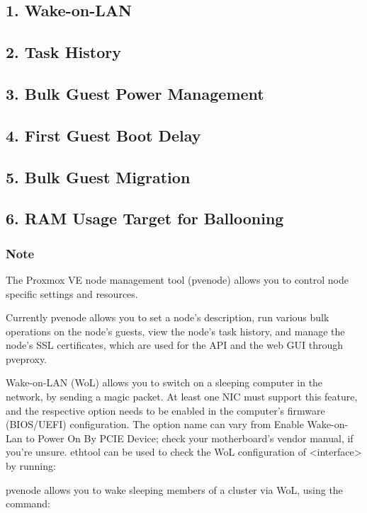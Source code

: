 \subsection{1. Wake-on-LAN}

\subsection{2. Task History}

\subsection{3. Bulk Guest Power Management}

\subsection{4. First Guest Boot Delay}

\subsection{5. Bulk Guest Migration}

\subsection{6. RAM Usage Target for Ballooning}

\subsubsection{Note}

The Proxmox VE node management tool (pvenode) allows you to control node specific settings and resources.

Currently pvenode allows you to set a node’s description, run various bulk operations on the node’s guests, view the node’s task history, and manage the node’s SSL certificates, which are used for the API and the web GUI through pveproxy.

Wake-on-LAN (WoL) allows you to switch on a sleeping computer in the network, by sending a magic packet. At least one NIC must support this feature, and the respective option needs to be enabled in the computer’s firmware (BIOS/UEFI) configuration. The option name can vary from Enable Wake-on-Lan to Power On By PCIE Device; check your motherboard’s vendor manual, if you’re unsure. ethtool can be used to check the WoL configuration of <interface> by running:

pvenode allows you to wake sleeping members of a cluster via WoL, using the command:

